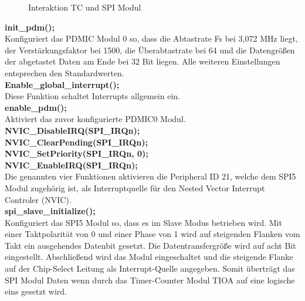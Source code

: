 \begin{figure}[H]
{
	}
	\caption{Interaktion TC und SPI Modul}
	\label{fig:interaction_tc_and_spi}
\end{figure}

\newpage

\textbf{init\_pdm();}\\
Konfiguriert das PDMIC Modul 0 so, dass die Abtastrate Fs bei 3,072 MHz liegt, der Verstärkungsfaktor bei 1500, die Überabtastrate bei 64 und die Datengrößen der abgetastet Daten am Ende bei 32 Bit liegen. Alle weiteren Einstellungen entsprechen den Standardwerten.\\
\textbf{Enable\_global\_interrupt();}\\
Diese Funktion schaltet Interrupts allgemein ein.\\
\textbf{enable\_pdm();}\\
Aktiviert das zuvor konfigurierte PDMIC0 Modul.\\
\textbf{NVIC\_DisableIRQ(SPI\_IRQn);}\\
\textbf{NVIC\_ClearPending(SPI\_IRQn);}\\
\textbf{NVIC\_SetPriority(SPI\_IRQn, 0);}\\
\textbf{NVIC\_EnableIRQ(SPI\_IRQn);}\\
Die genannten vier Funktionen aktivieren die Peripheral ID 21, welche dem SPI5 Modul zugehörig ist, als Interruptquelle für den Nested Vector Interrupt Controler (NVIC).\\
\textbf{spi\_slave\_initialize();}\\
Konfiguriert das SPI5 Modul so, dass es im Slave Modus betrieben wird. Mit einer Taktpolarität von 0 und einer Phase von 1 wird auf steigenden Flanken vom Takt ein ausgehendes Datenbit gesetzt. Die Datentransfergröße wird auf acht Bit eingestellt. Abschließend wird das Modul eingeschaltet und die steigende Flanke auf der Chip-Select Leitung als Interrupt-Quelle angegeben. Somit überträgt das SPI Modul Daten wenn durch das Timer-Counter Modul TIOA auf eine logische eins gesetzt wird.


